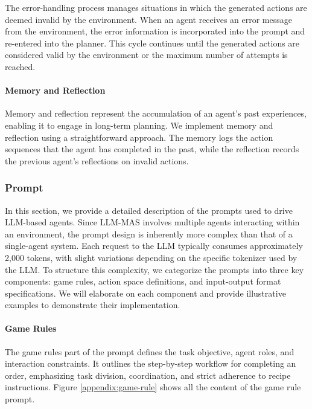 \documentclass[11pt]{article}
\begin{document}
The error-handling process manages situations in which the generated actions are deemed invalid by the environment. When an agent receives an error message from the environment, the error information is incorporated into the prompt and re-entered into the planner. This cycle continues until the generated actions are considered valid by the environment or the maximum number of attempts is reached.

\paragraph{Memory and Reflection}

Memory and reflection represent the accumulation of an agent’s past experiences, enabling it to engage in long-term planning. We implement memory and reflection using a straightforward approach. The memory logs the action sequences that the agent has completed in the past, while the reflection records the previous agent’s reflections on invalid actions.


\subsubsection{Prompt}

In this section, we provide a detailed description of the prompts used to drive LLM-based agents. Since LLM-MAS involves multiple agents interacting within an environment, the prompt design is inherently more complex than that of a single-agent system. Each request to the LLM typically consumes approximately 2,000 tokens, with slight variations depending on the specific tokenizer used by the LLM. To structure this complexity, we categorize the prompts into three key components: game rules, action space definitions, and input-output format specifications. We will elaborate on each component and provide illustrative examples to demonstrate their implementation.


\paragraph{Game Rules}

The game rules part of the prompt defines the task objective, agent roles, and interaction constraints. It outlines the step-by-step workflow for completing an order, emphasizing task division, coordination, and strict adherence to recipe instructions. Figure \ref{appendix:game-rule} shows all the content of the game rule prompt.
\end{document}
